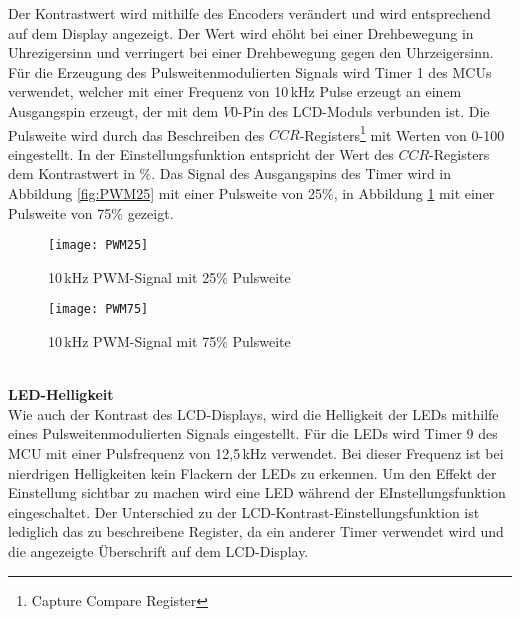 Der Kontrastwert wird mithilfe des Encoders verändert und wird entsprechend auf dem Display angezeigt. Der Wert wird ehöht bei einer Drehbewegung in Uhrezigersinn und verringert bei einer Drehbewegung gegen den Uhrzeigersinn.\\
Für die Erzeugung des Pulsweitenmodulierten Signals wird Timer 1 des MCUs verwendet, welcher mit einer Frequenz von 10\,kHz Pulse erzeugt an einem Ausgangspin erzeugt, der mit dem $V0$-Pin des LCD-Moduls verbunden ist. Die Pulsweite wird durch das Beschreiben des $CCR$-Registers\footnote{Capture Compare Register} mit Werten von 0-100 eingestellt. In der Einstellungsfunktion entspricht der Wert des $CCR$-Registers dem Kontrastwert in \%. Das Signal des Ausgangspins des Timer wird in Abbildung \ref{fig:PWM25} mit einer Pulsweite von 25\%, in Abbildung \ref{fig:PWM75} mit einer Pulsweite von 75\% gezeigt. 
\begin{figure}[h]
	\begin{minipage}{.48\linewidth}
		\centering
		\texttt{[image: PWM25]}
		\caption{10\,kHz PWM-Signal mit 25\% Pulsweite}
		\label{fig:PWM25}
	\end{minipage}
	\hfill
	\begin{minipage}{.48\linewidth}
		\centering
		\texttt{[image: PWM75]}
		\caption{10\,kHz PWM-Signal mit 75\% Pulsweite}
		\label{fig:PWM75}
	\end{minipage}
\end{figure}
\\
\newline
\textbf{LED-Helligkeit}\\
Wie auch der Kontrast des LCD-Displays, wird die Helligkeit der LEDs mithilfe eines Pulsweitenmodulierten Signals eingestellt. Für die LEDs wird Timer 9 des MCU mit einer Pulsfrequenz von 12,5\,kHz verwendet. Bei dieser Frequenz ist bei nierdrigen Helligkeiten kein Flackern der LEDs zu erkennen. Um den Effekt der Einstellung sichtbar zu machen wird eine LED während der EInstellungsfunktion eingeschaltet. Der Unterschied zu der LCD-Kontrast-Einstellungsfunktion ist lediglich das zu beschreibene Register, da ein anderer Timer verwendet wird und die angezeigte Überschrift auf dem LCD-Display.
